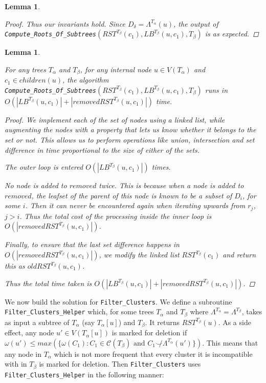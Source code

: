\documentclass{article}
\newcommand{\compatible}{\smile}
\newcommand{\leafset}{\Lambda}
\newcommand{\weight}{\omega}
\newcommand{\TA}{T_\alpha}
\newcommand{\TB}{T_\beta}
\newtheorem{computerootsofsubtreescorrectness}[incompatibility]{Lemma}
\newtheorem{computerootsofsubtreesruntime}[incompatibility]{Lemma}
\begin{document}
\begin{computerootsofsubtreescorrectness}
\begin{proof}
            Thus our invariants hold. Since $D_{\delta} = \leafset^{\TA}(u)$, the output of\\ %
            \texttt{Compute\_Roots\_Of\_Subtrees}$(RST^{\TB}(c_1), LB^{\TB}(u, c_1), \TB)$ is as expected.
        \end{proof}
    \end{computerootsofsubtreescorrectness}

    \begin{computerootsofsubtreesruntime}
        \label{lem:computerootsofsubtreesruntime}

        For any trees $\TA$ and $\TB$, for any internal node $u \in V(\TA)$ and $c_1 \in children(u)$, the algorithm\\ %
        \texttt{Compute\_Roots\_Of\_Subtrees}$(RST^{\TB}(c_1), LB^{\TB}(u, c_1), \TB)$ runs in\\ %
        $O(|LB^{\TB}(u, c_1)| + |removedRST^{\TB}(u, c_1)|)$ time.

        \begin{proof}
            We implement each of the set of nodes using a linked list, while augmenting the nodes with a property that lets us know whether it belongs to the set or not. This allows us to perform operations like union, intersection and set difference in time proportional to the size of either of the sets.

            The outer loop is entered $O(|LB^{\TB}(u, c_1)|)$ times.

            No node is added to $removed$ twice. This is because when a node is added to $removed$, the leafset of the parent of this node is known to be a subset of $D_i$, for some $i$. Then it can never be encountered again when iterating upwards from $r_j$, $j > i$. Thus the total cost of the processing inside the inner loop is $O(|removedRST^{\TB}(u, c_1)|)$.

            Finally, to ensure that the last set difference happens in $O(|removedRST^{\TB}(u, c_1)|)$, we modify the linked list $RST^{\TB}(c_1)$ and return this as $oldRST^{\TB}(u, c_1)$.

            Thus the total time taken is $O(|LB^{\TB}(u, c_1)| + |removedRST^{\TB}(u, c_1)|)$.
        \end{proof}
    \end{computerootsofsubtreesruntime}

    We now build the solution for \texttt{Filter\_Clusters}. We define a subroutine \texttt{Filter\_Clusters\_Helper} which, for some trees $\TA$ and $\TB$ where $\leafset^{\TA} = \leafset^{\TB}$, takes as input a subtree of $\TA$ (say $\TA[u]$) and $\TB$. It returns $RST^{\TB}(u)$. As a side effect, any node $u' \in V(\TA[u])$ is marked for deletion if $\weight(u') \leq max(\{\weight(C_1) : C_1 \in \mathcal{C}(\TB) \text{ and } C_1 \not\compatible \leafset^{\TA}(u')\})$. This means that any node in $\TA$ which is not more frequent that every cluster it is incompatible with in $\TB$ is marked for deletion. Then \texttt{Filter\_Clusters} uses \texttt{Filter\_Clusters\_Helper} in the following manner:
\end{document}
